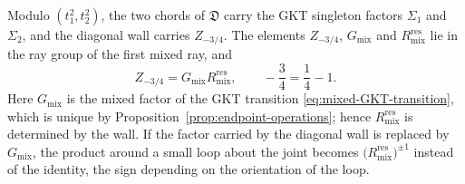 \begin{proposition}
\label{prop:first-decoration}
Modulo $(t_1^2,t_2^2)$, the two chords of $\mathfrak D$ carry the GKT
singleton factors $\Sigma_1$ and $\Sigma_2$, and the diagonal wall carries
$Z_{-3/4}$.  The elements $Z_{-3/4}$, $G_{\mathrm{mix}}$ and
$R^{\mathrm{res}}_{\mathrm{mix}}$ lie in the ray group of the first mixed ray, and
\begin{equation}\label{eq:three-quarter-split}
 Z_{-3/4}=G_{\mathrm{mix}}R^{\mathrm{res}}_{\mathrm{mix}},
 \qquad -\frac34=\frac14-1.
\end{equation}
Here $G_{\mathrm{mix}}$ is the mixed factor of the GKT transition
\eqref{eq:mixed-GKT-transition}, which is unique by
Proposition~\ref{prop:endpoint-operations}; hence $R^{\mathrm{res}}_{\mathrm{mix}}$ is
determined by the wall.  If the factor carried by the diagonal wall is replaced
by $G_{\mathrm{mix}}$, the product around a small loop about the joint
becomes $\bigl(R^{\mathrm{res}}_{\mathrm{mix}}\bigr)^{\pm1}$ instead of the identity, the sign depending
on the orientation of the loop.
\end{proposition}

